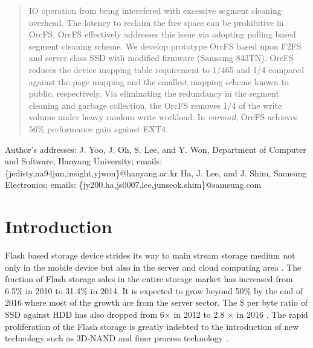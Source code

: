 \documentclass[prodmode,acmtecs]{acmsmall}
\begin{document}
\begin{abstract}
IO operation from being interefered with excessive segment cleaning overhead. 
The latency to reclaim the free space can be prohibitive in OrcFS.
OrcFS effectively addresses this issue via adopting polling based segment cleaning 
scheme. We develop prototype OrcFS based upon F2FS and server class SSD with modified 
firmware  (Samsung 843TN).
OrcFS reduces the device mapping table requirement to 1/465 and 1/4 compared 
against the page mapping and the smallest mapping scheme known
to public, respectively. 
Via eliminating the redundancy in the segment cleaning and garbage collection, 
the OrcFS removes 1/4 of the write volume under heavy random write
workload. In \emph{varmail}, 
OrcFS achieves 56\% performance gain against EXT4.
\end{abstract}




\begin{bottomstuff}

Author's addresses: J. Yoo, J. Oh, S. Lee, and Y. Won, Department of Computer 
and Software, Hanyang University; emails: \{jedisty,na94jun,insight,yjwon\}@hanyang.ac.kr
Ha, J. Lee, and J. Shim, Samsung Electronics; emails: \{jy200.ha,js0007.lee,junseok.shim\}@samsung.com
\end{bottomstuff}

\maketitle

\section{Introduction}

Flash based storage device strides its way to main stream storage
medium not only in the mobile device but also in the server and cloud
computing area \cite{enterpriseflash2015berry}. The fraction of Flash
storage sales in the entire storage market has increased from 6.5\% in
2010 to 31.4\% in 2014. It is expected to grow beyond 50\% by the end
of 2016 \cite{3dnand_samsung_news} where most of the growth are from
the server sector. The \$ per byte ratio of SSD against HDD has also
dropped from 6$\times$ in 2012 to 2.8 $\times$ in 2016
\cite{ssdprice}. The rapid proliferation of the Flash storage is
greatly indebted to the introduction of new technology such as 3D-NAND
\cite{3dnand_samsung} and finer process technology \cite{davis2013flash}.
\end{document}
